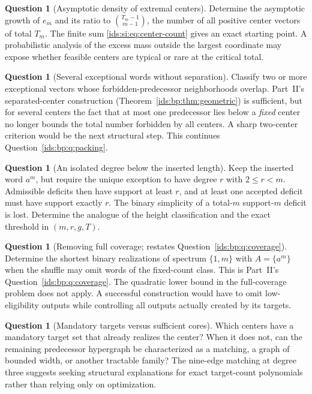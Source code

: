 \documentclass[11pt,letterpaper]{article}
\theoremstyle{definition}\newtheorem{definition}[theorem]{Definition}
\theoremstyle{remark}\newtheorem{remark}[theorem]{Remark}
\theoremstyle{definition}\newtheorem{question}[theorem]{Question}
\begin{document}
\begin{question}[Asymptotic density of extremal centers]\label{ids:si:q:density}
Determine the asymptotic growth of $e_m$ and its ratio to
$\binom{T_m-1}{m-1}$, the number of all positive center vectors of total
$T_m$. The finite sum \eqref{ids:si:eq:center-count} gives an exact starting point.
A probabilistic analysis of the excess mass outside the largest coordinate
may expose whether feasible centers are typical or rare at the critical total.
\end{question}

\begin{question}[Several exceptional words without separation]\label{ids:si:q:several}
Classify two or more exceptional vectors whose forbidden-predecessor
neighborhoods overlap. Part~II's separated-center construction
(Theorem~\ref{ids:bp:thm:geometric}) is sufficient,
but for several centers the fact that at most one predecessor lies below a
\emph{fixed} center no longer bounds the total number forbidden by all
centers. A sharp two-center criterion would be the next structural step.
This continues Question~\ref{ids:bp:q:packing}.
\end{question}

\begin{question}[An isolated degree below the inserted length]\label{ids:si:q:lower}
Keep the inserted word $a^m$, but require the unique exception to have degree
$r$ with $2\leq r<m$. Admissible deficits then have support at least $r$,
and at least one accepted deficit must have support exactly $r$. The binary
simplicity of a total-$m$ support-$m$ deficit is lost. Determine the analogue
of the height classification and the exact threshold in $(m,r,g,T)$.
\end{question}

\begin{question}[Removing full coverage; restates Question~\ref{ids:bp:q:coverage}]\label{ids:si:q:coverage}
Determine the shortest binary realizations of spectrum $\{1,m\}$ with
$A=\{a^m\}$ when the shuffle may omit words of the fixed-count class.
This is Part~II's Question~\ref{ids:bp:q:coverage}. The quadratic lower bound in the
full-coverage problem does not apply. A successful construction would have
to omit low-eligibility outputs while controlling all outputs actually
created by its targets.
\end{question}

\begin{question}[Mandatory targets versus sufficient cores]\label{ids:si:q:cores}
Which centers have a mandatory target set that already realizes the center?
When it does not, can the remaining predecessor hypergraph be characterized
as a matching, a graph of bounded width, or another tractable family? The
nine-edge matching at degree three suggests seeking structural explanations
for exact target-count polynomials rather than relying only on optimization.
\end{question}
\end{document}
